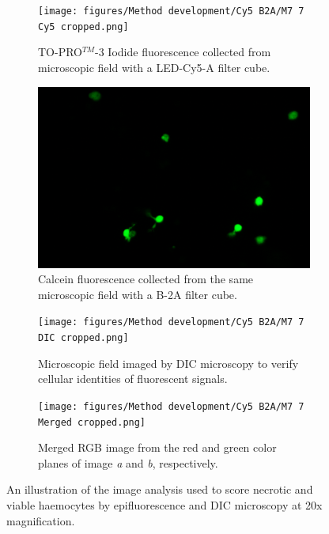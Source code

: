 \begin{figure}[H]
    \centering
    \begin{subfigure}[b]{.45\textwidth}
        \centering
        \texttt{[image: figures/Method development/Cy5 B2A/M7 7 Cy5 cropped.png]}
        \caption{TO-PRO$^{TM}$-3 Iodide fluorescence collected from microscopic field with a LED-Cy5-A filter cube.}
        \label{subfig:a}
    \end{subfigure}
    \hfill
    \begin{subfigure}[b]{.45\textwidth}
        \centering
        \includegraphics[width=\textwidth]{figures/Method development/Cy5 B2A/M7 7 B2A cropped.png}
        \caption{Calcein fluorescence collected from the same microscopic field with a B-2A filter cube.}
        \label{subfig:b}
    \end{subfigure}
    \newline
    \begin{subfigure}[b]{.45\textwidth}
        \centering
        \texttt{[image: figures/Method development/Cy5 B2A/M7 7 DIC cropped.png]}
        \caption{Microscopic field imaged by DIC microscopy to verify cellular identities of fluorescent signals.}
        \label{subfig:c}
    \end{subfigure}
    \hfill
    \begin{subfigure}[b]{.45\textwidth}
        \centering
        \texttt{[image: figures/Method development/Cy5 B2A/M7 7 Merged cropped.png]}
        \caption{Merged RGB image from the red and green color planes of image \emph{a} and \emph{b}, respectively.}
        \label{subfig:d}
    \end{subfigure}
    \caption{An illustration of the image analysis used to score necrotic and viable haemocytes by epifluorescence and DIC microscopy at 20x magnification.}
    \label{fig:Epifluorescent_scoring}
\end{figure}

